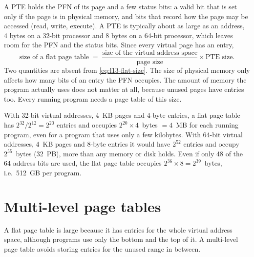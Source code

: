 \documentclass[../main.tex]{subfiles}
\begin{document}
A PTE holds the PFN of its page and a few status bits: a valid bit that is set
only if the page is in physical memory, and bits that record how the page may
be accessed (read, write, execute).  A PTE is typically about as large as an
address, 4 bytes on a 32-bit processor and 8 bytes on a 64-bit processor, which
leaves room for the PFN and the status bits.  Since every virtual page has an entry,
\begin{equation}
  \text{size of a flat page table}
  \;=\; \frac{\text{size of the virtual address space}}{\text{page size}}
        \times \text{PTE size} .
  \label{eq:l13-flat-size}
\end{equation}
Two quantities are absent from \cref{eq:l13-flat-size}.  The size of physical
memory only affects how many bits of an entry the PFN occupies.  The amount of
memory the program actually uses does not matter at all, because unused pages
have entries too.  Every running program needs a page table of this size.

\begin{example}
  \label{ex:l13-flat-size}
  With 32-bit virtual addresses, 4~KB pages and 4-byte entries, a flat page
  table has $2^{32}/2^{12} = 2^{20}$ entries and occupies
  $2^{20} \times 4$~bytes $= 4$~MB for each running program, even for a
  program that uses only a few kilobytes.  With 64-bit virtual addresses,
  4~KB pages and 8-byte entries it would have $2^{52}$ entries and occupy
  $2^{55}$~bytes (32~PB), more than any memory or disk holds.  Even if only 48
  of the 64 address bits are used, the flat page table occupies
  $2^{36} \times 8 = 2^{39}$~bytes, i.e.\ 512~GB per program.
\end{example}

\section{Multi-level page tables}
\label{sec:l13-multilevel}

A flat page table is large because it has entries for the whole virtual
address space, although programs use only the bottom and the top of
it.  A multi-level page
table avoids storing entries for the unused range in between.
\end{document}
